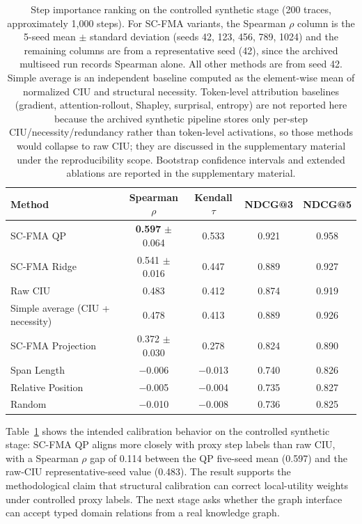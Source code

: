 \documentclass[a4paper,fleqn]{cas-sc}
\begin{document}
\begin{table}[ht]
\caption{Step importance ranking on the controlled synthetic stage (200 traces, approximately 1,000 steps). For SC-FMA variants, the Spearman $\rho$ column is the 5-seed mean $\pm$ standard deviation (seeds 42, 123, 456, 789, 1024) and the remaining columns are from a representative seed (42), since the archived multiseed run records Spearman alone. All other methods are from seed 42. Simple average is an independent baseline computed as the element-wise mean of normalized CIU and structural necessity. Token-level attribution baselines (gradient, attention-rollout, Shapley, surprisal, entropy) are not reported here because the archived synthetic pipeline stores only per-step CIU/necessity/redundancy rather than token-level activations, so those methods would collapse to raw CIU; they are discussed in the supplementary material under the reproducibility scope. Bootstrap confidence intervals and extended ablations are reported in the supplementary material.}
\label{tab:ranking-results}
\centering
\small
\begin{tabular}{lcccc}
\toprule
\textbf{Method} & \textbf{Spearman $\rho$} & \textbf{Kendall $\tau$} & \textbf{NDCG@3} & \textbf{NDCG@5} \\
\midrule
SC-FMA QP                  & \textbf{0.597} $\pm$ 0.064 & 0.533 & 0.921 & 0.958 \\
SC-FMA Ridge               & 0.541 $\pm$ 0.016 & 0.447 & 0.889 & 0.927 \\
Raw CIU                    & 0.483 & 0.412 & 0.874 & 0.919 \\
Simple average (CIU + necessity) & 0.478 & 0.413 & 0.889 & 0.926 \\
SC-FMA Projection          & 0.372 $\pm$ 0.030 & 0.278 & 0.824 & 0.890 \\
Span Length                & $-$0.006 & $-$0.013 & 0.740 & 0.826 \\
Relative Position          & $-$0.005 & $-$0.004 & 0.735 & 0.827 \\
Random                     & $-$0.010 & $-$0.008 & 0.736 & 0.825 \\
\bottomrule
\end{tabular}
\end{table}

Table~\ref{tab:ranking-results} shows the intended calibration behavior on the controlled synthetic stage: SC-FMA QP aligns more closely with proxy step labels than raw CIU, with a Spearman $\rho$ gap of 0.114 between the QP five-seed mean (0.597) and the raw-CIU representative-seed value (0.483). The result supports the methodological claim that structural calibration can correct local-utility weights under controlled proxy labels. The next stage asks whether the graph interface can accept typed domain relations from a real knowledge graph.
\end{document}
